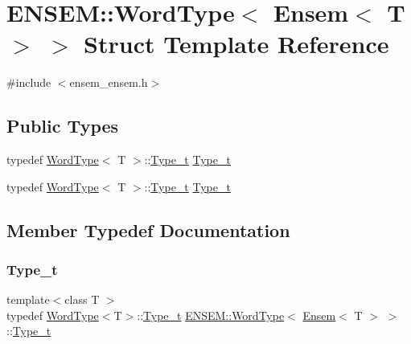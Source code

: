 \hypertarget{structENSEM_1_1WordType_3_01Ensem_3_01T_01_4_01_4}{}\section{E\+N\+S\+EM\+:\+:Word\+Type$<$ Ensem$<$ T $>$ $>$ Struct Template Reference}
\label{structENSEM_1_1WordType_3_01Ensem_3_01T_01_4_01_4}


{\ttfamily \#include $<$ensem\+\_\+ensem.\+h$>$}

\subsection*{Public Types}
\begin{DoxyCompactItemize}
\item 
typedef \mbox{\hyperlink{structENSEM_1_1WordType}{Word\+Type}}$<$ T $>$\+::\mbox{\hyperlink{structENSEM_1_1WordType_3_01Ensem_3_01T_01_4_01_4_af525fac697967b39c1ab3356734aeed7}{Type\+\_\+t}} \mbox{\hyperlink{structENSEM_1_1WordType_3_01Ensem_3_01T_01_4_01_4_af525fac697967b39c1ab3356734aeed7}{Type\+\_\+t}}
\item 
typedef \mbox{\hyperlink{structENSEM_1_1WordType}{Word\+Type}}$<$ T $>$\+::\mbox{\hyperlink{structENSEM_1_1WordType_3_01Ensem_3_01T_01_4_01_4_af525fac697967b39c1ab3356734aeed7}{Type\+\_\+t}} \mbox{\hyperlink{structENSEM_1_1WordType_3_01Ensem_3_01T_01_4_01_4_af525fac697967b39c1ab3356734aeed7}{Type\+\_\+t}}
\end{DoxyCompactItemize}


\subsection{Member Typedef Documentation}
\mbox{\label{structENSEM_1_1WordType_3_01Ensem_3_01T_01_4_01_4_af525fac697967b39c1ab3356734aeed7}} 
\subsubsection{\texorpdfstring{Type\_t}{Type\_t}\hspace{0.1cm}{\footnotesize\ttfamily [1/2]}}
{\footnotesize\ttfamily template$<$class T $>$ \\
typedef \mbox{\hyperlink{structENSEM_1_1WordType}{Word\+Type}}$<$T$>$\+::\mbox{\hyperlink{structENSEM_1_1WordType_3_01Ensem_3_01T_01_4_01_4_af525fac697967b39c1ab3356734aeed7}{Type\+\_\+t}} \mbox{\hyperlink{structENSEM_1_1WordType}{E\+N\+S\+E\+M\+::\+Word\+Type}}$<$ \mbox{\hyperlink{classENSEM_1_1Ensem}{Ensem}}$<$ T $>$ $>$\+::\mbox{\hyperlink{structENSEM_1_1WordType_3_01Ensem_3_01T_01_4_01_4_af525fac697967b39c1ab3356734aeed7}{Type\+\_\+t}}}

